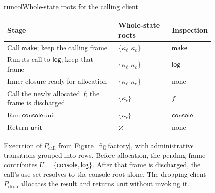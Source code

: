 \begin{figure}[!htbp]
\begin{examplepanel}{runcol}{Whole-state roots for the calling client}
\small
\renewcommand{\arraystretch}{1.3}
\begin{tabularx}{\linewidth}{@{}>{\raggedright\arraybackslash}Xll@{}}
\toprule
Stage & Whole-state roots & Inspection\\
\midrule
Call \(\mathsf{make}\); keep the calling frame
 & $\{\kappa_\ell,\kappa_c\}$ & $\mathsf{make}$\\
Run its call to \(\mathsf{log}\); keep that frame
 & $\{\kappa_\ell,\kappa_c\}$ & $\mathsf{log}$\\
Inner closure ready for allocation
 & $\{\kappa_\ell,\kappa_c\}$ & none\\
Call the newly allocated \(f\); the frame is discharged
 & $\{\kappa_c\}$ & $f$\\
Run \(\mathsf{console}\ \mathsf{unit}\)
 & $\{\kappa_c\}$ & $\mathsf{console}$\\
Return \(\mathsf{unit}\)
 & $\varnothing$ & none\\
\bottomrule
\end{tabularx}
\end{examplepanel}
\caption{Execution of \(P_{\mathrm{call}}\) from
Figure~\ref{fig:factory}, with administrative transitions grouped into
rows. Before allocation, the pending frame contributes
\(U=\{\mathsf{console},\mathsf{log}\}\).
After that frame is discharged, the call's use set resolves to the console
root alone. The dropping client \(P_{\mathrm{drop}}\) allocates the result
and returns \(\mathsf{unit}\) without invoking it.}
\label{fig:factory-run}
\end{figure}
